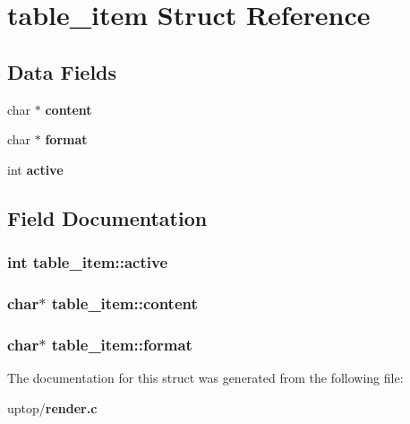 \section{table\_\-item Struct Reference}
\label{structtable__item}
\subsection*{Data Fields}
\begin{CompactItemize}
\item 
char $\ast$ \bf{content}
\item 
char $\ast$ \bf{format}
\item 
int \bf{active}
\end{CompactItemize}


\subsection{Field Documentation}
\subsubsection{\setlength{\rightskip}{0pt plus 5cm}int \bf{table\_\-item::active}}\label{structtable__item_15f6b035427ea3d13bbde182df265a5a}


\subsubsection{\setlength{\rightskip}{0pt plus 5cm}char$\ast$ \bf{table\_\-item::content}}\label{structtable__item_0ac559759f8e5637acd6b323788e869b}


\subsubsection{\setlength{\rightskip}{0pt plus 5cm}char$\ast$ \bf{table\_\-item::format}}\label{structtable__item_78e2a010cde992231b8983f56a4ffda0}




The documentation for this struct was generated from the following file:\begin{CompactItemize}
\item 
uptop/\bf{render.c}\end{CompactItemize}
